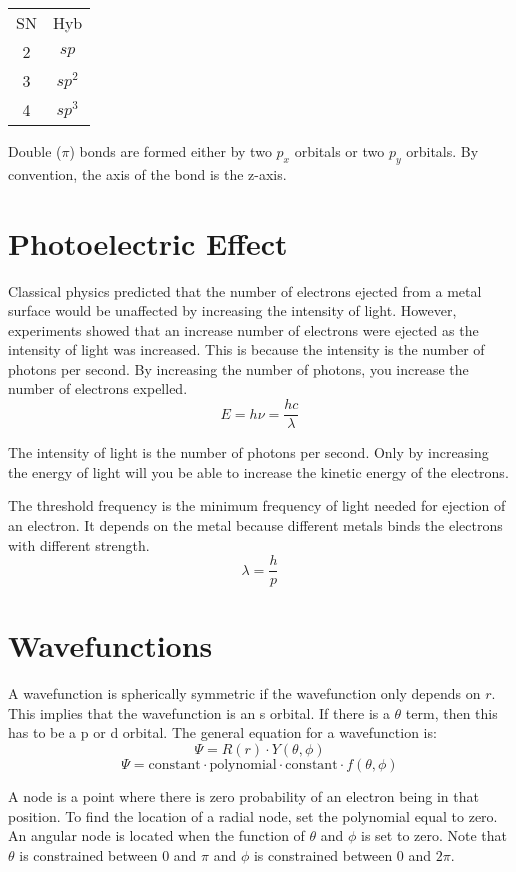 \documentclass{article}
\begin{document}
\begin{center}
  \begin{tabular}{ c c }
    SN & Hyb \\
    2 & $sp$ \\
    3 & $sp^{2}$ \\
    4 & $sp^{3}$ \\
  \end{tabular}
\end{center}

Double ($\pi$) bonds are formed either by two $p_{x}$ orbitals or two $p_{y}$
orbitals.  By convention, the axis of the bond is the z-axis.

\section{Photoelectric Effect}

Classical physics predicted that the number of electrons ejected from a metal
surface would be unaffected by increasing the intensity of light. However,
experiments showed that an increase number of electrons were ejected as the
intensity of light was increased. This is because the intensity is the number of
photons per second. By increasing the number of photons, you increase the number
of electrons expelled.
$$ E = h\nu = \frac{ h c }{ \lambda } $$

The intensity of light is the number of photons per second. Only by increasing
the energy of light will you be able to increase the kinetic energy of the
electrons.

The threshold frequency is the minimum frequency of light needed for ejection of
an electron. It depends on the metal because different metals binds the
electrons with different strength.
$$ \lambda = \frac{h}{p} $$

\section{Wavefunctions}

A wavefunction is spherically symmetric if the wavefunction only depends on $r$.
This implies that the wavefunction is an s orbital. If there is a $\theta$ term,
then this has to be a  p or d orbital. The general equation for a wavefunction
is:
$$ \Psi = R(r) \cdot Y(\theta, \phi) $$
$$ \Psi = \mathrm{constant} \cdot \mathrm{polynomial} \cdot \mathrm{constant}
\cdot f(\theta, \phi)$$

A node is a point where there is zero probability of an electron being in that
position. To find the location of a radial node, set the polynomial equal to
zero. An angular node is located when the function of $\theta$ and $\phi$ is set
to zero. Note that $\theta$ is constrained between $0$ and $\pi$ and $\phi$ is
constrained between $0$ and $2\pi$.
\end{document}
